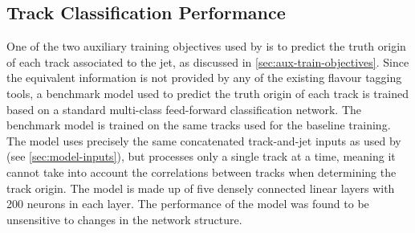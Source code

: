 


\subsection{Track Classification Performance}\label{sec:gnn_tc_perf}

One of the two auxiliary training objectives used by \GNN is to predict the truth origin of each track associated to the jet, as discussed in \cref{sec:aux-train-objectives}.
Since the equivalent information is not provided by any of the existing flavour tagging tools, a benchmark model used to predict the truth origin of each track is trained based on a standard multi-class feed-forward classification network.
The benchmark model is trained on the same tracks used for the baseline \GNN training.
The model uses precisely the same concatenated track-and-jet inputs as used by \GNN (see \cref{sec:model-inputs}), but processes only a single track at a time, meaning it cannot take into account the correlations between tracks when determining the track origin.
The model is made up of five densely connected linear layers with 200 neurons in each layer.
The performance of the model was found to be unsensitive to changes in the network structure. 

